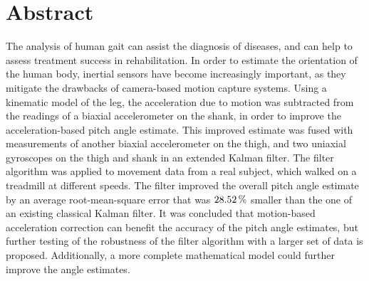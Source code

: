\chapter{Abstract}

The analysis of human gait can assist the diagnosis of diseases, and can help to assess treatment success in rehabilitation. In order to estimate the orientation of the human body, inertial sensors have become increasingly important, as they mitigate the drawbacks of camera-based motion capture systems. Using a kinematic model of the leg, the acceleration due to motion was subtracted from the readings of a biaxial accelerometer on the shank, in order to improve the acceleration-based pitch angle estimate. This improved estimate was fused with measurements of another biaxial accelerometer on the thigh, and two uniaxial gyroscopes on the thigh and shank in an extended Kalman filter. The filter algorithm was applied to movement data from a real subject, which walked on a treadmill at different speeds. The filter improved the overall pitch angle estimate by an average root-mean-square error that was $\unit[28.52]{\%}$ smaller than the one of an existing classical Kalman filter. It was concluded that motion-based acceleration correction can benefit the accuracy of the pitch angle estimates, but further testing of the robustness of the filter algorithm with a larger set of data is proposed. Additionally, a more complete mathematical model could further improve the angle estimates.
